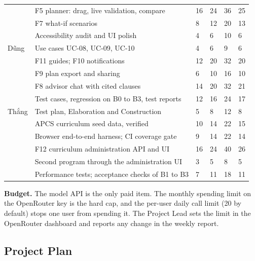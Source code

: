 \documentclass{article}
\newenvironment{changed}{\par\color{chg}}{\par}
\begin{document}
{\begin{xltabular}{\dimexpr{}\tabcolsep\relax}{@{}p{2.2cm}Yp{0.7cm}p{0.7cm}p{0.7cm}p{0.7cm}@{}}
 & F5 planner: drag, live validation, compare & 16 & 24 & 36 & 25\\
 & F7 what-if scenarios & 8 & 12 & 20 & 13\\
 & Accessibility audit and UI polish & 4 & 6 & 10 & 6\\
Dũng & Use cases UC-08, UC-09, UC-10 & 4 & 6 & 9 & 6\\
 & F11 guides; F10 notifications & 12 & 20 & 32 & 20\\
 & F9 plan export and sharing & 6 & 10 & 16 & 10\\
 & F8 advisor chat with cited clauses & 14 & 20 & 32 & 21\\
 & Test cases, regression on B0 to B3, test reports & 12 & 16 & 24 & 17\\
Thắng & Test plan, Elaboration and Construction & 5 & 8 & 12 & 8\\
 & APCS curriculum seed data, verified & 10 & 14 & 22 & 15\\
 & Browser end-to-end harness; CI coverage gate & 9 & 14 & 22 & 14\\
 & F12 curriculum administration API and UI & 16 & 24 & 40 & 26\\
 & Second program through the administration UI & 3 & 5 & 8 & 5\\
 & Performance tests; acceptance checks of B1 to B3 & 7 & 11 & 18 & 11\\
\end{xltabular}}

\begin{changed}
\textbf{Budget.} The model API is the only paid item. The monthly spending limit on the OpenRouter key is the hard cap, and
the per-user daily call limit (20 by default) stops one user from spending it. The Project Lead sets the limit in the
OpenRouter dashboard and reports any change in the weekly report.
\end{changed}

\subsection{Project Plan}
\end{document}
